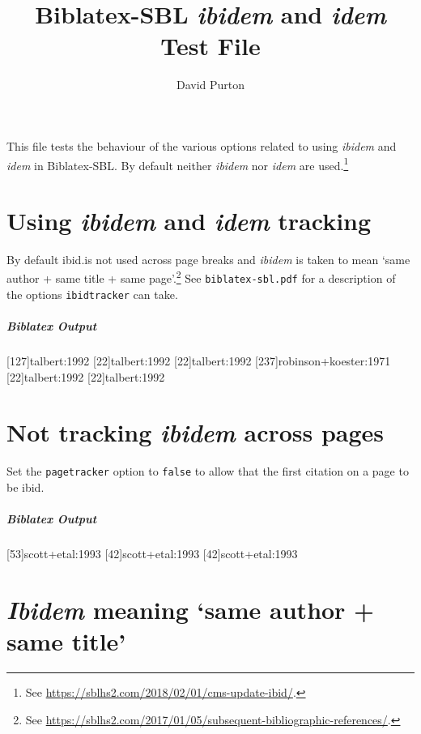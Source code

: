 \documentclass[a4paper]{article}
\title{Biblatex-SBL \emph{ibidem} and \emph{idem} Test File}
\author{David Purton}
\date{}
\newenvironment{biboutput}{%
  \subparagraph{Biblatex Output}
}{\color{black}}
\begin{document}
\maketitle

This file tests the behaviour of the various options related to using
\emph{ibidem} and \emph{idem} in Biblatex-SBL. By default neither
\emph{ibidem} nor \emph{idem} are used.\footnote{See
\url{https://sblhs2.com/2018/02/01/cms-update-ibid/}.}

\section*{Using \emph{ibidem} and \emph{idem} tracking}

By default ibid.\@ is not used across page breaks and \emph{ibidem} is taken
to mean ‘same author + same title + same page’.\footnote{See
\url{https://sblhs2.com/2017/01/05/subsequent-bibliographic-references/}.} See
\texttt{biblatex-sbl.pdf} for a description of the options
\texttt{ibidtracker} can take.

\begin{biboutput}
  [127]{talbert:1992}
  [22]{talbert:1992}
  [22]{talbert:1992}
  [237]{robinson+koester:1971}
  [22]{talbert:1992}
  \clearpage
  [22]{talbert:1992}
\end{biboutput}

\section*{Not tracking \emph{ibidem} across pages}

Set the \texttt{pagetracker} option to \texttt{false} to allow that the first
citation on a page to be ibid. 


\begin{biboutput}
  [53]{scott+etal:1993}
  [42]{scott+etal:1993}
  \clearpage
  [42]{scott+etal:1993}
\end{biboutput}

\section*{\emph{Ibidem} meaning ‘same author + same title’}
\end{document}
